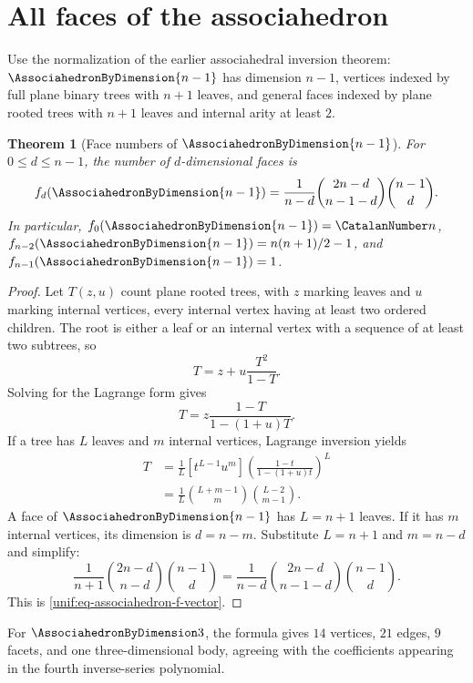 \documentclass[11pt,a4paper,oneside,openany]{book}
\newtheorem{theorem}{Theorem}[chapter]
\theoremstyle{definition}
\theoremstyle{remark}
\begin{document}
\section{All faces of the associahedron}

Use the normalization of the earlier associahedral inversion theorem:
$\AssociahedronByDimension{n-1}$
has dimension $n-1$, vertices indexed by full plane binary trees with $n+1$
leaves, and general faces indexed by plane rooted trees with $n+1$ leaves and
internal arity at least $2$.

\begin{theorem}[Face numbers of $\AssociahedronByDimension{n-1}$]
\label{unif:thm-associahedron-f-vector}
For $0\le d\le n-1$, the number of $d$-dimensional faces is
\begin{equation}\label{unif:eq-associahedron-f-vector}
 f_d(\AssociahedronByDimension{n-1})
 =\frac1{n-d}\binom{2n-d}{n-1-d}\binom{n-1}{d}.
\end{equation}
In particular, $f_0(\AssociahedronByDimension{n-1})=\CatalanNumber n$,
$f_{n-2}(\AssociahedronByDimension{n-1})=n(n+1)/2-1$, and
$f_{n-1}(\AssociahedronByDimension{n-1})=1$.
\end{theorem}
\begin{proof}
Let $T(z,u)$ count plane rooted trees, with $z$ marking leaves and $u$ marking
internal vertices, every internal vertex having at least two ordered children.
The root is either a leaf or an internal vertex with a sequence of at least two
subtrees, so
\[
 T=z+u\frac{T^2}{1-T}.
\]
Solving for the Lagrange form gives
\[
 T=z\frac{1-T}{1-(1+u)T}.
\]
If a tree has $L$ leaves and $m$ internal vertices, Lagrange inversion yields
\begin{align*}
 [z^Lu^m]T
 &=\frac1L[t^{L-1}u^m]
 \left(\frac{1-t}{1-(1+u)t}\right)^L\\
 &=\frac1L\binom{L+m-1}{m}\binom{L-2}{m-1}.
\end{align*}
A face of $\AssociahedronByDimension{n-1}$ has $L=n+1$ leaves. If it has $m$ internal vertices, its
dimension is $d=n-m$. Substitute $L=n+1$ and $m=n-d$ and simplify:
\[
 \frac1{n+1}\binom{2n-d}{n-d}\binom{n-1}{d}
 =\frac1{n-d}\binom{2n-d}{n-1-d}\binom{n-1}{d}.
\]
This is \eqref{unif:eq-associahedron-f-vector}.
\end{proof}

For $\AssociahedronByDimension3$, the formula gives $14$ vertices, $21$ edges, $9$ facets, and one
three-dimensional body, agreeing with the coefficients appearing in the
fourth inverse-series polynomial.
\end{document}
